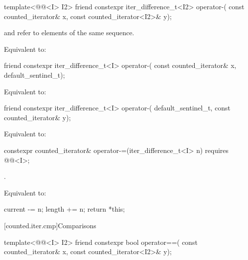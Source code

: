%
\begin{itemdecl}
template<@@<I> I2>
  friend constexpr iter_difference_t<I2> operator-(
    const counted_iterator& x, const counted_iterator<I2>& y);
\end{itemdecl}

\begin{itemdescr}
\pnum
\expects
{} and  refer to elements of the same
sequence.

\pnum
\effects
Equivalent to: 
\end{itemdescr}

%
\begin{itemdecl}
friend constexpr iter_difference_t<I> operator-(
  const counted_iterator& x, default_sentinel_t);
\end{itemdecl}

\begin{itemdescr}
\pnum
\effects
Equivalent to:
\end{itemdescr}

%
\begin{itemdecl}
friend constexpr iter_difference_t<I> operator-(
  default_sentinel_t, const counted_iterator& y);
\end{itemdecl}

\begin{itemdescr}
\pnum
\effects
Equivalent to: 
\end{itemdescr}

%
\begin{itemdecl}
constexpr counted_iterator& operator-=(iter_difference_t<I> n)
  requires @@<I>;
\end{itemdecl}

\begin{itemdescr}
\pnum
\expects
{}.

\pnum
\effects
Equivalent to:
\begin{codeblock}
current -= n;
length += n;
return *this;
\end{codeblock}
\end{itemdescr}

[counted.iter.cmp]{Comparisons}

%
\begin{itemdecl}
template<@@<I> I2>
  friend constexpr bool operator==(
    const counted_iterator& x, const counted_iterator<I2>& y);
\end{itemdecl}

